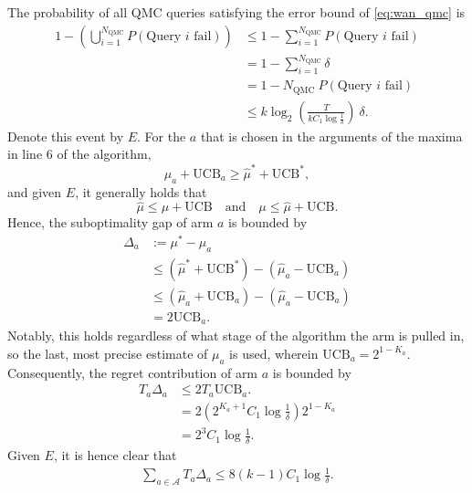 The probability of all QMC queries satisfying the error bound of \cref{eq:wan_qmc} is
\begin{equation}
    \begin{aligned}
        1 - \left(\bigcup_{i = 1}^{N_{\text{QMC}}} P(\text{Query } i \text{ fail}) \right)
         & \leq
        1 - \sum_{i = 1}^{N_{\text{QMC}}} P(\text{Query } i \text{ fail})             \\
         & =
        1 - \sum_{i = 1}^{N_{\text{QMC}}} \delta                                      \\
         & =
        1 - N_{\text{QMC}} \ P(\text{Query } i \text{ fail})                          \\
         & \leq k \log_2 \left(\frac{T}{k C_1 \log \frac{1}{\delta}}\right) \ \delta.
    \end{aligned}
\end{equation}
Denote this event by $E$.
For the $a$ that is chosen in the arguments of the maxima in line 6 of the algorithm,
\begin{equation}
    \hat\mu_a + \text{UCB}_a \geq \hat\mu^* + \text{UCB}^*,
\end{equation}
and given $E$, it generally holds that
\begin{equation}
    \hat\mu \leq \mu + \text{UCB}
    \quad \text{and} \quad
    \mu \leq \hat\mu + \text{UCB}.
\end{equation}
Hence, the suboptimality gap of arm $a$ is bounded by
\begin{equation}
    \begin{aligned}
        \Delta_a & := \mu^* - \mu_a                                             \\
                 & \leq (\hat\mu^* + \text{UCB}^*) - (\hat\mu_a - \text{UCB}_a) \\
                 & \leq (\hat\mu_a + \text{UCB}_a) - (\hat\mu_a - \text{UCB}_a) \\
                 & = 2 \text{UCB}_a.
    \end{aligned}
\end{equation}
Notably, this holds regardless of what stage of the algorithm the arm is pulled in, so the last, most precise estimate of $\mu_a$ is used, wherein $\text{UCB}_a = 2^{1 - K_a}$.
Consequently, the regret contribution of arm $a$ is bounded by
\begin{equation}
    \begin{aligned}
        T_a \Delta_a & \leq 2 T_a \text{UCB}_a.                            \\
                     & = 2 (2^{K_a + 1} C_1 \log \frac1\delta) 2^{1 - K_a} \\
                     & = 2^3 C_1 \log \frac1\delta.
    \end{aligned}
\end{equation}
Given $E$, it is hence clear that
\begin{equation}
    \begin{aligned}
        \sum_{a \in \mathcal{A}} T_a \Delta_a  \leq 8 (k-1) C_1 \log \frac1\delta.
    \end{aligned}
\end{equation}

